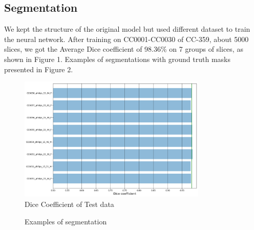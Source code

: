 \documentclass[10pt]{article}
\begin{document}
\subsection{Segmentation}
We kept the structure of the original model but used different dataset to train the neural network. After training on CC0001-CC0030
of CC-359, about 5000 slices, we got the Average Dice coefficient of 98.36\% on 7 groups of slices, as shown in Figure 1. Examples of segmentations with ground truth masks presented in Figure 2.
\begin{figure}[H] 
\centering 
\includegraphics[width=0.8\textwidth]{DSC} 
\caption{Dice Coefficient of Test data} 
\label{DSC} 
\end{figure}

\begin{figure}[H]
\centering 
{}
\caption{Examples of segmentation}
\end{figure}
\end{document}
